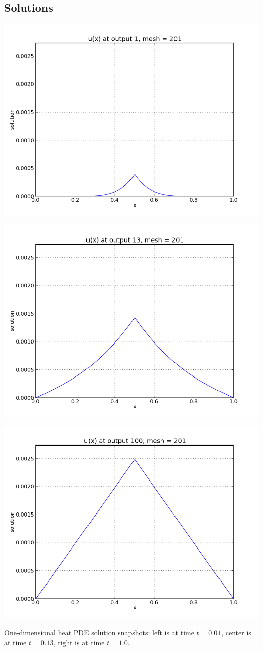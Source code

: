 \documentclass[letterpaper,10pt,english]{sphinxmanual}
\begin{document}
\subsection{Solutions}
\label{c_serial:id25}
\includegraphics[width=0.300\linewidth]{plot-ark_heat1d_1.png}

\includegraphics[width=0.300\linewidth]{plot-ark_heat1d_2.png}

\includegraphics[width=0.300\linewidth]{plot-ark_heat1d_3.png}

One-dimensional heat PDE solution snapshots: left is at time \(t=0.01\),
center is at time \(t=0.13\), right is at time \(t=1.0\).
\end{document}
